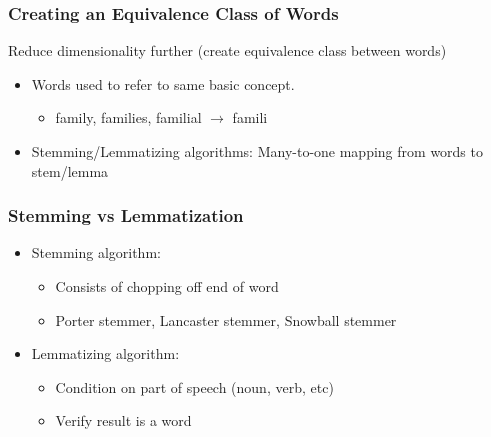 \documentclass[compress, aspectratio=54]{beamer}
\begin{document}

\begin{frame}
\frametitle{Creating an Equivalence Class of Words}
Reduce dimensionality further (create equivalence class between words)
\begin{itemize}
\item Words used to refer to same basic concept. 
\begin{itemize}
\item family, families, familial $\rightarrow$ famili
\end{itemize}

\item Stemming/Lemmatizing algorithms: Many-to-one mapping from
words to stem/lemma
\end{itemize}
\end{frame}


\begin{frame}
\frametitle{Stemming vs Lemmatization}
\begin{itemize}
\item Stemming algorithm: 
\begin{itemize}
\item Consists of chopping off end of word
\item Porter stemmer, Lancaster stemmer, Snowball stemmer
\end{itemize}

\item Lemmatizing algorithm:
\begin{itemize}
\item Condition on part of speech (noun, verb, etc)
\item Verify result is a word
\end{itemize}

\end{itemize}
\end{frame}
\end{document}

